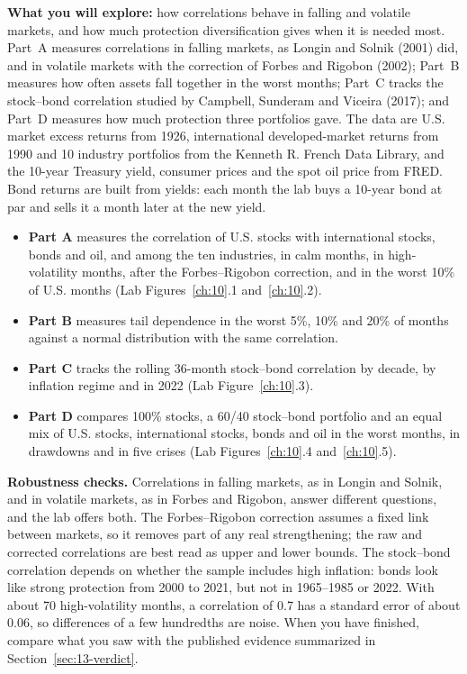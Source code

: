 \textbf{What you will explore:} how correlations behave in falling and volatile markets, and how much protection diversification gives when it is needed most. Part~A measures correlations in falling markets, as Longin and Solnik (2001) did, and in volatile markets with the correction of Forbes and Rigobon (2002); Part~B measures how often assets fall together in the worst months; Part~C tracks the stock--bond correlation studied by Campbell, Sunderam and Viceira (2017); and Part~D measures how much protection three portfolios gave. The data are U.S. market excess returns from 1926, international developed-market returns from 1990 and 10 industry portfolios from the Kenneth R. French Data Library, and the 10-year Treasury yield, consumer prices and the spot oil price from FRED. Bond returns are built from yields: each month the lab buys a 10-year bond at par and sells it a month later at the new yield.

\begin{itemize}
  \item \textbf{Part A} measures the correlation of U.S. stocks with international stocks, bonds and oil, and among the ten industries, in calm months, in high-volatility months, after the Forbes--Rigobon correction, and in the worst 10\% of U.S. months (Lab Figures~\ref{ch:10}.1 and~\ref{ch:10}.2).
  \item \textbf{Part B} measures tail dependence in the worst 5\%, 10\% and 20\% of months against a normal distribution with the same correlation.
  \item \textbf{Part C} tracks the rolling 36-month stock--bond correlation by decade, by inflation regime and in 2022 (Lab Figure~\ref{ch:10}.3).
  \item \textbf{Part D} compares 100\% stocks, a 60/40 stock--bond portfolio and an equal mix of U.S. stocks, international stocks, bonds and oil in the worst months, in drawdowns and in five crises (Lab Figures~\ref{ch:10}.4 and~\ref{ch:10}.5).
\end{itemize}

\label{sec:13-stress}
\textbf{Robustness checks.} Correlations in falling markets, as in Longin and Solnik, and in volatile markets, as in Forbes and Rigobon, answer different questions, and the lab offers both. The Forbes--Rigobon correction assumes a fixed link between markets, so it removes part of any real strengthening; the raw and corrected correlations are best read as upper and lower bounds. The stock--bond correlation depends on whether the sample includes high inflation: bonds look like strong protection from 2000 to 2021, but not in 1965--1985 or 2022. With about 70 high-volatility months, a correlation of 0.7 has a standard error of about 0.06, so differences of a few hundredths are noise. When you have finished, compare what you saw with the published evidence summarized in Section~\ref{sec:13-verdict}.

